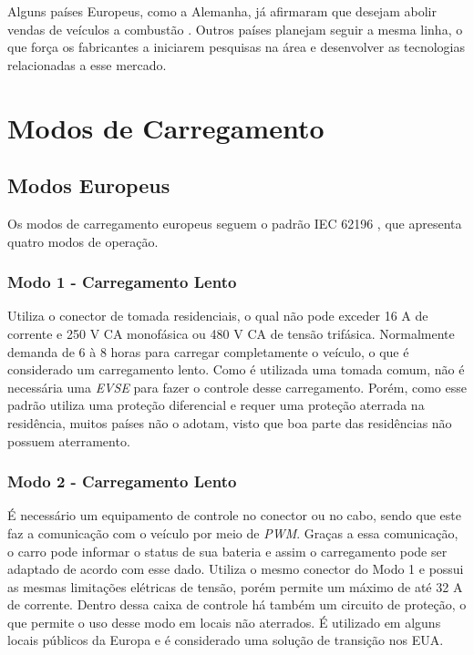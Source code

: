     Alguns países Europeus, como a Alemanha, já afirmaram que desejam abolir vendas de veículos a combustão \cite{forbes-news-germany}. Outros países planejam seguir a mesma linha, o que força os fabricantes a iniciarem pesquisas na área e desenvolver as tecnologias relacionadas a esse mercado.

  \section{Modos de Carregamento}
  \label{stateofart:modes}

    \subsection{Modos Europeus}
    \label{stateofart:modes:europe}

      Os modos de carregamento europeus seguem o padrão IEC 62196 \cite{iec-62196}, que apresenta quatro modos de operação.

        \subsubsection{Modo 1 - Carregamento Lento}
        \label{stateofart:modes:europe:mode1}

        Utiliza o conector de tomada residenciais, o qual não pode exceder 16 A de corrente e 250 V \ac{CA} monofásica ou 480 V \ac{CA} de tensão trifásica. Normalmente demanda de 6 à 8 horas para carregar completamente o veículo, o que é considerado um carregamento lento. Como é utilizada uma tomada comum, não é necessária uma \textit{\ac{EVSE}} para fazer o controle desse carregamento. Porém, como esse padrão utiliza uma proteção diferencial e requer uma proteção aterrada na residência, muitos países não o adotam, visto que boa parte das residências não possuem aterramento.

        \subsubsection{Modo 2 - Carregamento Lento}
        \label{stateofart:modes:europe:mode2}

        É necessário um equipamento de controle no conector ou no cabo, sendo que este faz a comunicação com o veículo por meio de \textit{\ac{PWM}}. Graças a essa comunicação, o carro pode informar o status de sua bateria e assim o carregamento pode ser adaptado de acordo com esse dado. Utiliza o mesmo conector do Modo 1 e possui as mesmas limitações elétricas de tensão, porém permite um máximo de até 32 A de corrente. Dentro dessa caixa de controle há também um circuito de proteção, o que permite o uso desse modo em locais não aterrados. É utilizado em alguns locais públicos da Europa e é considerado uma solução de transição nos EUA.

